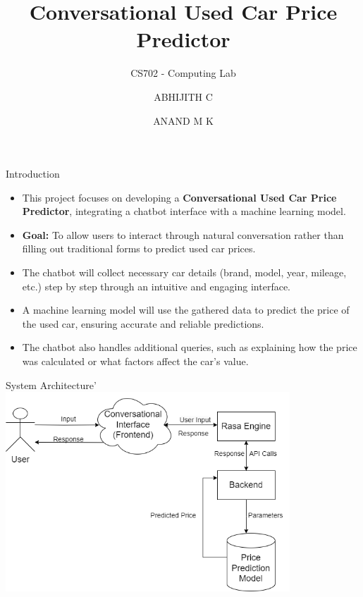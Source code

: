 \documentclass{beamer}
\title{Conversational Used Car Price Predictor}
\subtitle{CS702 - Computing Lab}
\author{ABHIJITH C \and ANAND M K}
\institute{Department of Computer Science and Engineering \\ NITK Surathkal}
\date{}  %
\begin{document}
\begin{frame}[t]
    \titlepage
\end{frame}

\begin{frame}[t]{Introduction}
    \begin{itemize}
        \item This project focuses on developing a \textbf{Conversational Used Car Price Predictor}, integrating a chatbot interface with a machine learning model.
        \item \textbf{Goal:} To allow users to interact through natural conversation rather than filling out traditional forms to predict used car prices.
        \item The chatbot will collect necessary car details (brand, model, year, mileage, etc.) step by step through an intuitive and engaging interface.
        \item A machine learning model will use the gathered data to predict the price of the used car, ensuring accurate and reliable predictions.
        \item The chatbot also handles additional queries, such as explaining how the price was calculated or what factors affect the car’s value.
    \end{itemize}
\end{frame}


\begin{frame}{System Architecture}'
    \centering
   	 \includegraphics[width=0.8\textwidth]{Midsem.drawio.png}
\end{frame}
\end{document}
